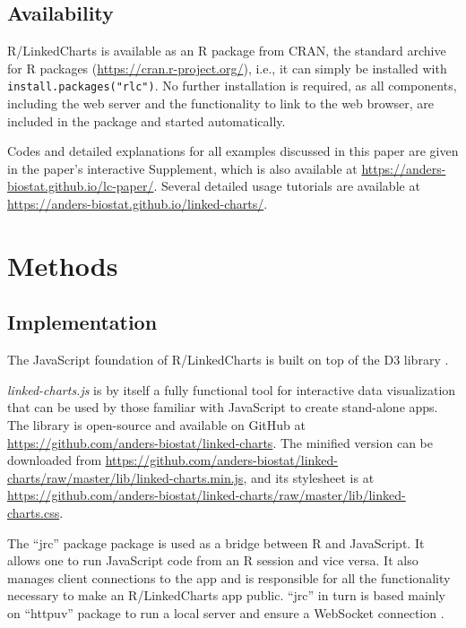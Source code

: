 \documentclass[twocolumn,10pt]{article}
\begin{document}
\subsection{Availability}

R/LinkedCharts is available as an R package from CRAN, the standard archive for R packages (\url{https://cran.r-project.org/}), i.e., it can simply be installed with \texttt{install.packages("rlc")}. No further installation is required, as all components, including the web server and the functionality to link to the web browser, are included in the package and started automatically.

Codes and detailed explanations for all examples discussed in this paper are given in the paper's interactive Supplement, which is also available at \url{https://anders-biostat.github.io/lc-paper/}. Several detailed usage tutorials are available at \url{https://anders-biostat.github.io/linked-charts/}.


\section{Methods}

\subsection{Implementation}

The JavaScript foundation of R/LinkedCharts is built on top of the D3 library \citep{bostock_2011}. 

\emph{linked-charts.js} is by itself a fully functional tool for interactive data visualization that can be used by those familiar with JavaScript to create stand-alone apps. The library is open-source and available on GitHub at \url{https://github.com/anders-biostat/linked-charts}. The minified version can be downloaded from \url{https://github.com/anders-biostat/linked-charts/raw/master/lib/linked-charts.min.js}, and its stylesheet is at \url{https://github.com/anders-biostat/linked-charts/raw/master/lib/linked-charts.css}.

The ``jrc'' package \citep{jrc_2020} package is used as a bridge between R and JavaScript. It allows one to run JavaScript code from an R session and vice versa. It also manages client connections to the app and is responsible for all the functionality necessary to make an R/LinkedCharts app public. ``jrc'' in turn is based mainly on ``httpuv'' \citep{cheng_2020} package to run a local server and ensure a WebSocket connection \citep{fette_rfc_2011}. 
\end{document}
